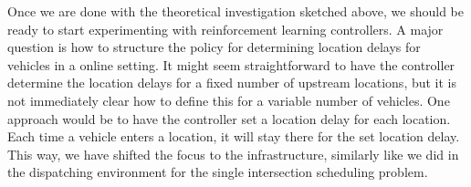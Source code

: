 \documentclass{article}
\theoremstyle{definition}
\theoremstyle{plain}
\begin{document}
Once we are done with the theoretical investigation sketched above, we should be
ready to start experimenting with reinforcement learning controllers. A major
question is how to structure the policy for determining location delays for
vehicles in a online setting. It might seem straightforward to have the
controller determine the location delays for a fixed number of upstream
locations, but it is not immediately clear how to define this for a variable
number of vehicles. One approach would be to have the controller set a location
delay for each location. Each time a vehicle enters a location, it will stay
there for the set location delay. This way, we have shifted the focus to the
infrastructure, similarly like we did in the dispatching environment for the
single intersection scheduling problem.




\end{document}

